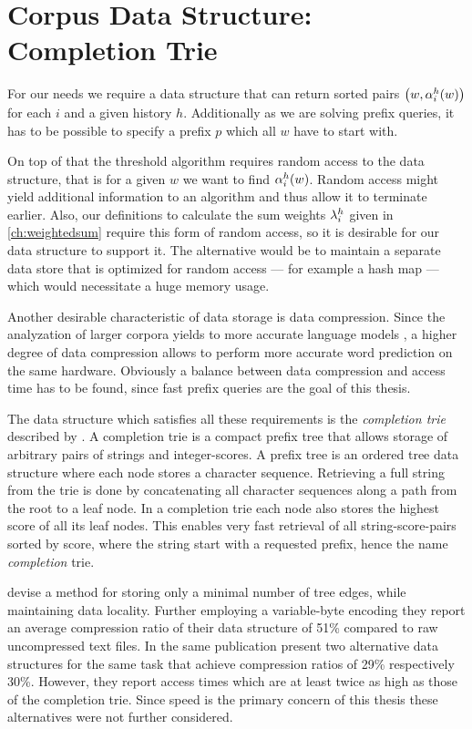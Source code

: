 \section{Corpus Data Structure: Completion Trie}
\label{sec:completiontrie}

For our needs we require a data structure that can return sorted pairs
$\left(w, \alpha^h_i(w)\right)$ for each $i$ and a given history $h$.
Additionally as we are solving prefix queries, it has to be possible to specify
a prefix $p$ which all $w$ have to start with.

On top of that the threshold algorithm requires random access to the data
structure, that is for a given $w$ we want to find $\alpha^h_i(w)$.
Random access might yield additional information to an algorithm and thus allow
it to terminate earlier.
Also, our definitions to calculate the sum weights $\lambda^h_i$ given in
\cref{ch:weightedsum} require this form of random access, so it is desirable for
our data structure to support it.
The alternative would be to maintain a separate data store that is optimized for
random access --- for example a hash map --- which would necessitate a huge
memory usage.

Another desirable characteristic of data storage is data compression.
Since the analyzation of larger corpora yields to more accurate language models
\noref, a higher degree of data compression allows to perform more accurate
word prediction on the same hardware.
Obviously a balance between data compression and access time has to be found,
since fast prefix queries are the goal of this thesis.

The data structure which satisfies all these requirements is the
\emph{completion trie} described by \textcite{HsuOttaviano2013}.
A completion trie is a compact prefix tree that allows storage of arbitrary
pairs of strings and integer-scores.
A prefix tree is an ordered tree data structure where each node stores a
character sequence.
Retrieving a full string from the trie is done by concatenating all character
sequences along a path from the root to a leaf node.
In a completion trie each node also stores the highest score of all its leaf
nodes.
This enables very fast retrieval of all string-score-pairs sorted by score,
where the string start with a requested prefix, hence the name
\emph{completion} trie.

\textcite{HsuOttaviano2013} devise a method for storing only a minimal number of
tree edges, while maintaining data locality.
Further employing a variable-byte encoding they report an average compression
ratio of their data structure of 51\% compared to raw uncompressed text files.
In the same publication \textcite{HsuOttaviano2013} present two alternative
data structures for the same task that achieve compression ratios of 29\%
respectively 30\%.
However, they report access times which are at least twice as high as those
of the completion trie.
Since speed is the primary concern of this thesis these alternatives
were not further considered.

